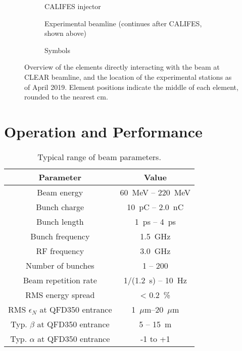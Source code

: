 \documentclass[a4paper,
               keeplastbox,   %
               ]{jacow}
\begin{document}
\begin{figure*}[t]
  \centering
  \begin{subfigure}{\textwidth}
    \centering
    
    \vspace{-2.5em} %
    \caption{CALIFES injector}
  \end{subfigure}
  \begin{subfigure}{\textwidth}
    \centering
    \vspace{-1em}
    
    \vspace{-0.5em}
    \caption{Experimental beamline
      (continues after CALIFES, shown above)}
  \end{subfigure}
  \begin{subfigure}{\textwidth}
    \centering
    \vspace{-0.5em}
    
    \vspace{-2em} %
    \caption{Symbols}
  \end{subfigure}
  \caption{Overview of the elements directly interacting with the beam at CLEAR beamline, and the location of the experimental stations as of April 2019. Element positions indicate the middle of each element, rounded to the nearest cm.}
  \label{fig:layout}
\end{figure*}

\section{Operation and Performance}

\begin{table}[t]
  \centering
  \caption{Typical range of beam parameters.}
  \label{tab:beamparameters}
  \begin{tabular}{c c}
    \toprule
    \textbf{Parameter} & \textbf{Value} \\
    \midrule
    Beam energy       &  60~MeV -- 220~MeV\\
    Bunch charge      &  10~pC  -- 2.0~nC \\
    Bunch length      &   1~ps  -- 4~ps \\
    Bunch frequency   &   1.5~GHz \\
    RF frequency      &   3.0~GHz \\
    Number of bunches &   1 -- 200 \\
    Beam repetition rate   & 1/(1.2~s) -- 10~Hz \\
    RMS energy spread & < 0.2~\% \\
    RMS $\epsilon_N$ at QFD350 entrance & 1~$\mu$m--20~$\mu$m\\
    Typ. $\beta$ at QFD350 entrance & 5 -- 15~m \\
    Typ. $\alpha$ at QFD350 entrance & -1 to +1 \\
    \bottomrule
  \end{tabular}
  ~\vspace{-2em} %
\end{table}
\end{document}
